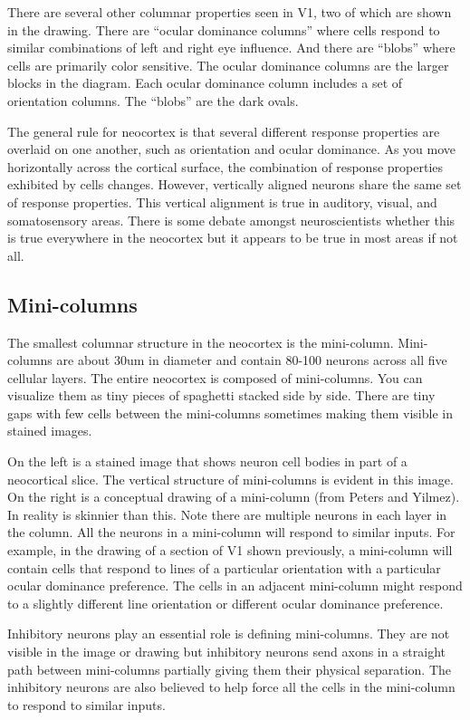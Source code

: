 \documentclass{report}
\begin{document}
There are several other columnar properties seen in V1, two of which
are shown in the drawing. There are ``ocular dominance columns'' where
cells respond to similar combinations of left and right eye
influence. And there are ``blobs'' where cells are primarily color
sensitive. The ocular dominance columns are the larger blocks in the
diagram. Each ocular dominance column includes a set of orientation
columns. The ``blobs'' are the dark ovals.

The general rule for neocortex is that several different response
properties are overlaid on one another, such as orientation and ocular
dominance. As you move horizontally across the cortical surface, the
combination of response properties exhibited by cells
changes. However, vertically aligned neurons share the same set of
response properties. This vertical alignment is true in auditory,
visual, and somatosensory areas. There is some debate amongst
neuroscientists whether this is true everywhere in the neocortex but
it appears to be true in most areas if not all.

\subsection*{Mini-columns}
The smallest columnar structure in the neocortex is the
mini-column. Mini-columns are about 30um in diameter and contain
80-100 neurons across all five cellular layers. The entire neocortex
is composed of mini-columns. You can visualize them as tiny pieces of
spaghetti stacked side by side. There are tiny gaps with few cells
between the mini-columns sometimes making them visible in stained
images.


On the left is a stained image that shows neuron cell bodies in part
of a neocortical slice. The vertical structure of mini-columns is
evident in this image. On the right is a conceptual drawing of a
mini-column (from Peters and Yilmez). In reality is skinnier than
this. Note there are multiple neurons in each layer in the column. All
the neurons in a mini-column will respond to similar inputs. For
example, in the drawing of a section of V1 shown previously, a
mini-column will contain cells that respond to lines of a particular
orientation with a particular ocular dominance preference. The cells
in an adjacent mini-column might respond to a slightly different line
orientation or different ocular dominance preference.

Inhibitory neurons play an essential role is defining
mini-columns. They are not visible in the image or drawing but
inhibitory neurons send axons in a straight path between mini-columns
partially giving them their physical separation. The inhibitory
neurons are also believed to help force all the cells in the
mini-column to respond to similar inputs.
\end{document}
